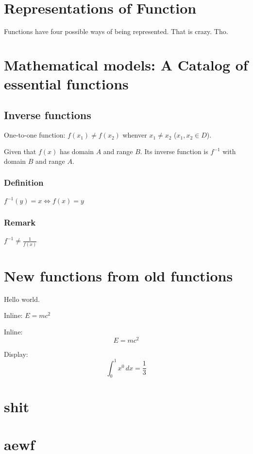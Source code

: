 \documentclass{article}
\begin{document}
\section{Representations of Function}

Functions have four possible ways of being represented. That is crazy. Tho.

\section{Mathematical models: A Catalog of essential functions}

\subsection{Inverse functions}

One-to-one function: $f(x_1)\neq f(x_2)$ whenver $x_1\neq x_2$ ($x_1,x_2\in D$).

Given that $f(x)$ has domain $A$ and range $B$.
Its inverse function is $f^{-1}$ with domain $B$ and range $A$.

\subsubsection{Definition}

$f^{-1}(y)=x\Leftrightarrow f(x)=y$

\subsubsection{Remark}

$f^{-1}\neq \frac1{f(x)}$

\section{New functions from old functions}

Hello world.

Inline: $E=mc^2$

Inline: $$E=mc^2$$



Display:
\[
	\int_0^1x^0\,dx=\frac13
\]

\section{shit}
\section{aewf}
\end{document}
